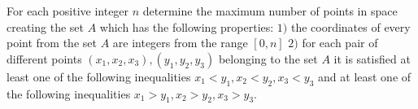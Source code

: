 For each positive integer $n$ determine the maximum number of points in space creating the set $A$ which has the following properties:
$1)$ the coordinates of every point from the set $A$ are integers from the range $[0, n]$
$2)$ for each pair of different points $(x_1,x_2,x_3), (y_1,y_2,y_3)$ belonging to the set $A$ it is satisfied at least one of the following inequalities $x_1< y_1, x_2<y_2, x_3<y_3$ and at least one of the following inequalities $x_1>y_1, x_2>y_2,x_3>y_3$.